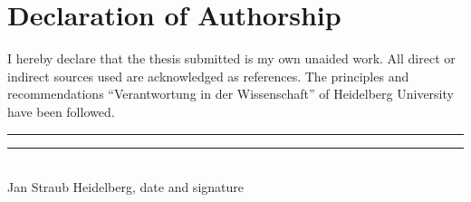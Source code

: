 
\section*{Declaration of Authorship}

I hereby declare that the thesis submitted is my own unaided work. All direct or indirect sources used are acknowledged as references. The principles and recommendations \enquote{Verantwortung in der Wissenschaft} of Heidelberg University have been followed.
\vspace{5cm}\\
\noindent\rule[0.5ex]{8em}{0.5pt} \hfill \rule[0.5ex]{10em}{0.5pt}\\
\noindent Jan Straub \hfill Heidelberg, date and signature